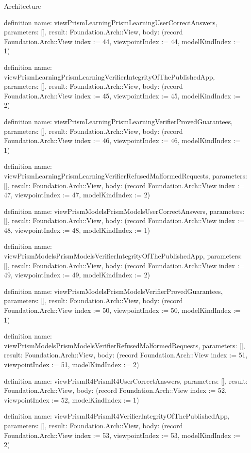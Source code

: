 \begin{lexlean}{Architecture}
\begin{semanticmodule}
definition{
  name: viewPrismLearningPrismLearningUserCorrectAnswers,
  parameters: [],
  result: Foundation.Arch::View,
  body: (record Foundation.Arch::View {index := 44, viewpointIndex := 44, modelKindIndex := 1})
}

definition{
  name: viewPrismLearningPrismLearningVerifierIntegrityOfThePublishedApp,
  parameters: [],
  result: Foundation.Arch::View,
  body: (record Foundation.Arch::View {index := 45, viewpointIndex := 45, modelKindIndex := 2})
}

definition{
  name: viewPrismLearningPrismLearningVerifierProvedGuarantees,
  parameters: [],
  result: Foundation.Arch::View,
  body: (record Foundation.Arch::View {index := 46, viewpointIndex := 46, modelKindIndex := 1})
}

definition{
  name: viewPrismLearningPrismLearningVerifierRefusedMalformedRequests,
  parameters: [],
  result: Foundation.Arch::View,
  body: (record Foundation.Arch::View {index := 47, viewpointIndex := 47, modelKindIndex := 2})
}

definition{
  name: viewPrismModelsPrismModelsUserCorrectAnswers,
  parameters: [],
  result: Foundation.Arch::View,
  body: (record Foundation.Arch::View {index := 48, viewpointIndex := 48, modelKindIndex := 1})
}

definition{
  name: viewPrismModelsPrismModelsVerifierIntegrityOfThePublishedApp,
  parameters: [],
  result: Foundation.Arch::View,
  body: (record Foundation.Arch::View {index := 49, viewpointIndex := 49, modelKindIndex := 2})
}

definition{
  name: viewPrismModelsPrismModelsVerifierProvedGuarantees,
  parameters: [],
  result: Foundation.Arch::View,
  body: (record Foundation.Arch::View {index := 50, viewpointIndex := 50, modelKindIndex := 1})
}

definition{
  name: viewPrismModelsPrismModelsVerifierRefusedMalformedRequests,
  parameters: [],
  result: Foundation.Arch::View,
  body: (record Foundation.Arch::View {index := 51, viewpointIndex := 51, modelKindIndex := 2})
}

definition{
  name: viewPrismR4PrismR4UserCorrectAnswers,
  parameters: [],
  result: Foundation.Arch::View,
  body: (record Foundation.Arch::View {index := 52, viewpointIndex := 52, modelKindIndex := 1})
}

definition{
  name: viewPrismR4PrismR4VerifierIntegrityOfThePublishedApp,
  parameters: [],
  result: Foundation.Arch::View,
  body: (record Foundation.Arch::View {index := 53, viewpointIndex := 53, modelKindIndex := 2})
}


\end{semanticmodule}
\end{lexlean}
